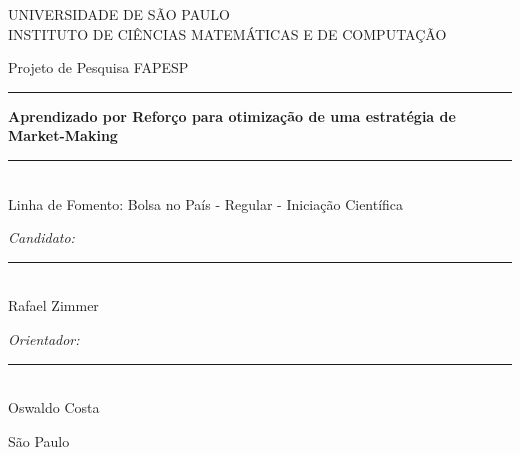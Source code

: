 \documentclass[12pt,a4paper]{article}
\begin{document}
\doublespacing

\begin{titlepage}
    \begin{center}
        {\large \sc UNIVERSIDADE DE SÃO PAULO} \\
        {\large \sc INSTITUTO DE CIÊNCIAS MATEMÁTICAS E DE COMPUTAÇÃO}\\[0.7cm]
        
        \vspace{4cm}

        {\large \sc Projeto de Pesquisa FAPESP}\\
        \rule{\linewidth}{2pt}
        
        \vspace{0.7em} %
        {\Large \bfseries Aprendizado por Reforço para otimização de uma estratégia de Market-Making }
        \vspace{0.2em} %
        
        \rule{\linewidth}{2pt} \\
        {\small \sc Linha de Fomento: Bolsa no País - Regular - Iniciação Científica}
    \end{center}
    
    \vspace{2.8cm}

    \begin{minipage}{0.43\textwidth}
        \emph{Candidato:}\\[2.08cm]
        \rule{0.9\linewidth}{0.3mm}\\
        Rafael Zimmer
    \end{minipage}
    \hspace{1cm}
    \begin{minipage}{0.43\textwidth}
        \emph{Orientador:}\\[2.08cm]
        \rule{0.9\linewidth}{0.3mm}\\
        Oswaldo Costa
    \end{minipage}

    \vfill

    \begin{center}
        \makeatletter
        São Paulo \\
        \@date
        \makeatother
    \end{center}
\end{titlepage}
\end{document}
